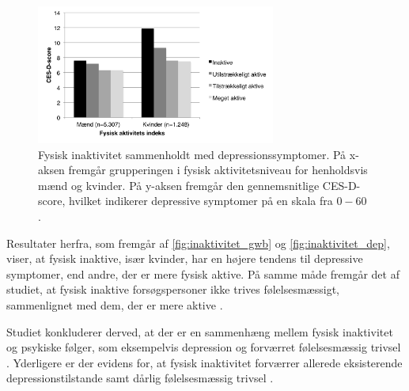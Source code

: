\begin{figure}[H]
\centering
\includegraphics[width=0.7\textwidth]{figures/inaktivitet_dep}
\caption{Fysisk inaktivitet sammenholdt med depressionssymptomer. På x-aksen fremgår grupperingen i fysisk aktivitetsniveau for henholdsvis mænd og kvinder. På y-aksen fremgår den gennemsnitlige CES-D-score, hvilket indikerer depressive symptomer på en skala fra $0-60$ \citep{galper2006}.}
\label{fig:inaktivitet_dep}
\end{figure}

\noindent
Resultater herfra, som fremgår af \autoref{fig:inaktivitet_gwb} og \autoref{fig:inaktivitet_dep}, viser, at fysisk inaktive, især kvinder, har en højere tendens til depressive symptomer, end andre, der er mere fysisk aktive. På samme måde fremgår det af studiet, at fysisk inaktive forsøgspersoner  ikke trives følelsesmæssigt, sammenlignet med dem, der er mere aktive \citep{galper2006}. 

Studiet konkluderer derved, at der er en sammenhæng mellem fysisk inaktivitet og psykiske følger, som eksempelvis depression og forværret følelsesmæssig trivsel \citep{galper2006}. Yderligere er der evidens for, at fysisk inaktivitet forværrer allerede eksisterende depressionstilstande samt dårlig følelsesmæssig trivsel \citep{motionsraad2007}.
